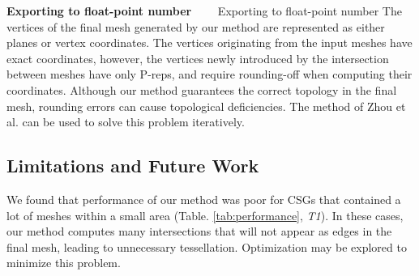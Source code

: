 \vspace{0.5em}
\noindent\textbf{Exporting to float-point number}~~~~
Exporting to float-point number The vertices of the final mesh generated by our method are represented as either planes or vertex coordinates. The vertices originating from the input meshes have exact coordinates, however, the vertices newly introduced by the intersection between meshes have only P-reps, and require rounding-off when computing their coordinates. Although our method guarantees the correct topology in the final mesh, rounding errors can cause topological deficiencies. The method of Zhou et al. \cite{zhou2016mesh} can be used to solve this problem iteratively.

\subsection{Limitations and Future Work}



We found that performance of our method was poor for CSGs that contained a lot of meshes within a small area (Table. \ref{tab:performance}, \emph{T1}). In these cases, our method computes many intersections that will not appear as edges in the final mesh, leading to unnecessary tessellation. Optimization may be explored to minimize this problem.

